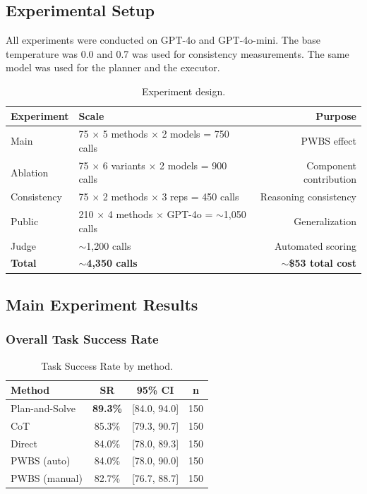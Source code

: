 \documentclass[11pt,a4paper]{article}
\begin{document}
\subsection{Experimental Setup}

All experiments were conducted on GPT-4o and GPT-4o-mini. The base temperature was 0.0 and 0.7 was used for consistency measurements. The same model was used for the planner and the executor.

\begin{table}[h]
\centering
\caption{Experiment design.}
\label{tab:setup}
\begin{tabular}{llr}
\toprule
\textbf{Experiment} & \textbf{Scale} & \textbf{Purpose} \\
\midrule
Main & 75 $\times$ 5 methods $\times$ 2 models = 750 calls & PWBS effect \\
Ablation & 75 $\times$ 6 variants $\times$ 2 models = 900 calls & Component contribution \\
Consistency & 75 $\times$ 2 methods $\times$ 3 reps = 450 calls & Reasoning consistency \\
Public & 210 $\times$ 4 methods $\times$ GPT-4o = $\sim$1,050 calls & Generalization \\
Judge & $\sim$1,200 calls & Automated scoring \\
\midrule
\textbf{Total} & $\sim$\textbf{4,350 calls} & $\sim$\textbf{\$53 total cost} \\
\bottomrule
\end{tabular}
\end{table}

\subsection{Main Experiment Results}

\subsubsection{Overall Task Success Rate}

\begin{table}[h]
\centering
\caption{Task Success Rate by method.}
\label{tab:sr}
\begin{tabular}{lccc}
\toprule
\textbf{Method} & \textbf{SR} & \textbf{95\% CI} & \textbf{n} \\
\midrule
Plan-and-Solve & \textbf{89.3\%} & [84.0, 94.0] & 150 \\
CoT & 85.3\% & [79.3, 90.7] & 150 \\
Direct & 84.0\% & [78.0, 89.3] & 150 \\
PWBS (auto) & 84.0\% & [78.0, 90.0] & 150 \\
PWBS (manual) & 82.7\% & [76.7, 88.7] & 150 \\
\bottomrule
\end{tabular}
\end{table}
\end{document}
